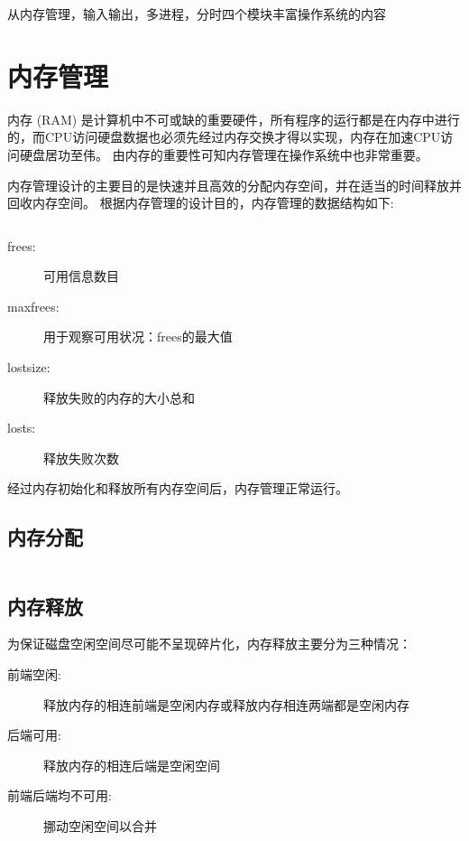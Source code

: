 \documentclass{swfcthesis}
\begin{document}
	从内存管理，输入输出，多进程，分时四个模块丰富操作系统的内容

	\section{内存管理}

		内存 (RAM) 是计算机中不可或缺的重要硬件，所有程序的运行都是在内存中进行的，而CPU访问硬盘数据也必须先经过内存交换才得以实现，内存在加速CPU访问硬盘居功至伟。
		由内存的重要性可知内存管理在操作系统中也非常重要。	
		
		内存管理设计的主要目的是快速并且高效的分配内存空间，并在适当的时间释放并回收内存空间。
		根据内存管理的设计目的，内存管理的数据结构如下:

		\inputminted[tabsize=2, firstline=137, lastline=143,
		linenos=true]{c}{../ZOS/src/kernel/bootpack.h}
		
		\begin{description}
			\item[frees:]可用信息数目
			\item[maxfrees:]用于观察可用状况：frees的最大值
			\item[lostsize:]释放失败的内存的大小总和
			\item[losts:]释放失败次数
		\end{description}
		
		经过内存初始化和释放所有内存空间后，内存管理正常运行。
		
		\subsection{内存分配}

		\begin{listing}[H]
			\inputminted[tabsize=2, firstline=68, lastline=80,
			linenos=true]{c}{../ZOS/src/kernel/memory.c}
		\end{listing}
		
		\subsection{内存释放}

		为保证磁盘空闲空间尽可能不呈现碎片化，内存释放主要分为三种情况：

		\begin{description}
			\item[前端空闲:]释放内存的相连前端是空闲内存或释放内存相连两端都是空闲内存
			\item[后端可用:]释放内存的相连后端是空闲空间
			\item[前端后端均不可用:]挪动空闲空间以合并
		\end{description}
\end{document}
